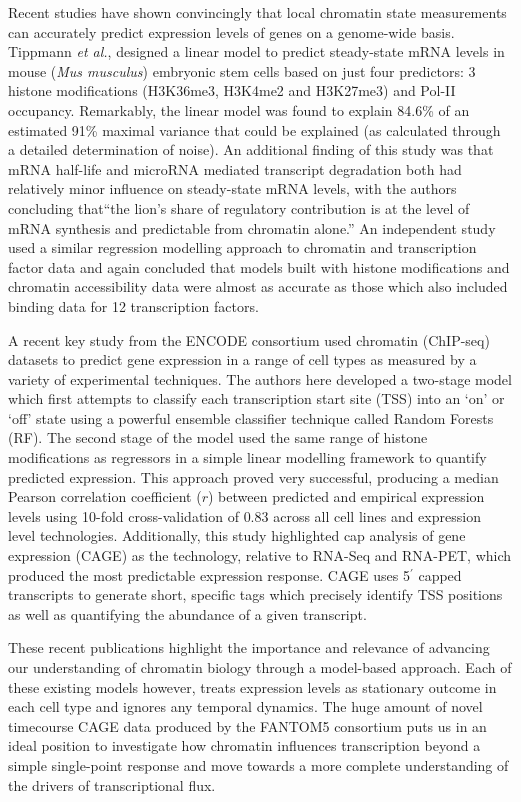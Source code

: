 \documentclass[a4paper,11pt,oneside]{book}
\begin{document}
Recent studies have shown convincingly that local chromatin state
measurements can accurately predict expression levels of genes on a
genome-wide basis. Tippmann \emph{et
  al.},\cite{Tippmann2012} designed a linear model to predict
steady-state mRNA levels in mouse (\emph{Mus musculus}) embryonic stem
cells based on just four predictors: 3 histone modifications
(H3K36me3, H3K4me2 and H3K27me3) and
Pol-II occupancy. Remarkably, the linear model was found to explain
84.6\% of an estimated 91\% maximal variance that could be explained
(as calculated through a detailed determination of noise). An additional
finding of this study was that mRNA half-life and microRNA mediated
transcript degradation both had relatively minor influence on
steady-state mRNA levels, with the authors concluding that``the lion's
share of regulatory contribution is at the level of mRNA synthesis and
predictable from chromatin alone.''\cite{Tippmann2012} An independent
study used a similar regression modelling approach to chromatin
and transcription factor data and again
concluded that models built with histone modifications and chromatin
accessibility data were almost as accurate as those which also
included binding data for 12 transcription factors.\cite{McLeay2012a} 

A recent key study from the ENCODE consortium used chromatin (ChIP-seq) datasets to predict gene expression in a range
of cell types as measured by a variety of experimental techniques.\cite{Dong2012} The authors here developed a
two-stage model which first attempts to classify each transcription
start site (TSS) into an `on' or `off' state using a powerful ensemble
classifier technique called Random Forests (RF). The second stage of the
model used the same range of histone modifications as regressors in a
simple linear modelling framework to quantify predicted
expression. This approach proved very successful, producing a
median Pearson correlation coefficient ($r$) between predicted and
empirical expression levels using 10-fold cross-validation of
$0.83$ across all cell lines and expression level
technologies.\cite{Dong2012} Additionally, this study highlighted cap
analysis of gene expression (CAGE) as the 
technology, relative to RNA-Seq and RNA-PET, which produced the most
predictable expression response. CAGE uses 5$^\prime$ capped transcripts to
generate short, specific tags which precisely identify TSS positions as well as
quantifying the abundance of a given transcript.\cite{Shiraki2003, Kodzius2006}

These recent publications highlight the importance and relevance of
advancing our understanding of chromatin biology through a model-based
approach. Each of these existing models however, treats expression
levels as stationary outcome in each cell type and ignores any temporal
dynamics. The huge amount of novel timecourse CAGE data 
produced by the FANTOM5 consortium\cite{fantom5} puts us in an ideal
position to investigate how chromatin influences transcription beyond a
simple single-point response and move towards a more complete
understanding of the drivers of transcriptional flux.
\end{document}
